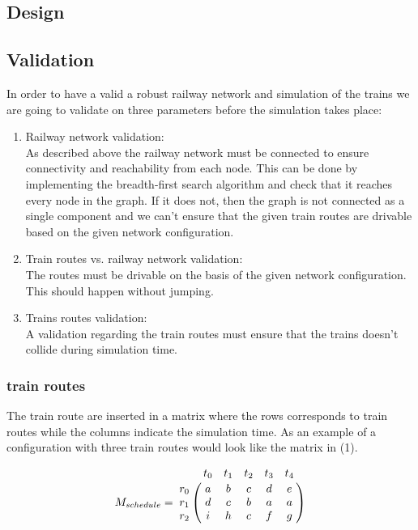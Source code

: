 \documentclass[10pt,a4paper]{article}
\begin{document}
\subsection{Design}
\subsection{Validation}
 
In order to have a valid a robust railway network and simulation of the trains we are going to validate on three parameters before the simulation takes place:
\begin{enumerate}
\item Railway network validation: \\
      As described above the railway network must be connected to ensure connectivity and reachability from each node. This can be done by implementing the breadth-first search algorithm and check that it reaches every node in the graph. If it does not, then the graph is not connected as a single component and we can’t ensure that the given train routes are drivable based on the given network configuration.
 
\item Train routes vs. railway network validation: \\
      The routes must be drivable on the basis of the given network configuration. This should happen without jumping.
 
\item Trains routes validation: \\
      A validation regarding the train routes must ensure that the trains doesn’t collide during simulation time. 

\end{enumerate}
 
 
\subsubsection{train routes}
 
The train route are inserted in a matrix where the rows corresponds to train routes while the columns indicate the simulation time.
As an example of a configuration with three train routes would look like the matrix in (1).

\begin{equation}
M_{schedule} = \bordermatrix{
                    ~ & t_0 & t_1 & t_2 & t_3 & t_4 \cr
                  r_0 & a   & b   & c   & d   & e\cr
                  r_1 & d   & c   & b   & a   & a\cr
                  r_2 & i   & h   & c   & f   & g}
\end{equation}
\end{document}
